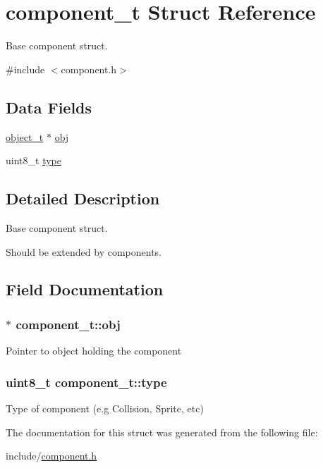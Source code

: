 \hypertarget{structcomponent__t}{}\section{component\+\_\+t Struct Reference}
\label{structcomponent__t}


Base component struct.  




{\ttfamily \#include $<$component.\+h$>$}

\subsection*{Data Fields}
\begin{DoxyCompactItemize}
\item 
\hyperlink{structobject__t}{object\+\_\+t} $\ast$ \hyperlink{structcomponent__t_a91ca5a259f6a90c3ed6e3cf433c30537}{obj}
\item 
uint8\+\_\+t \hyperlink{structcomponent__t_a540e44777d93cf3b028acee101676dc5}{type}
\end{DoxyCompactItemize}


\subsection{Detailed Description}
Base component struct. 

Should be extended by components. 

\subsection{Field Documentation}
\subsubsection[{\texorpdfstring{obj}{obj}}]{$\ast$ component\+\_\+t\+::obj}\hypertarget{structcomponent__t_a91ca5a259f6a90c3ed6e3cf433c30537}{}\label{structcomponent__t_a91ca5a259f6a90c3ed6e3cf433c30537}
Pointer to object holding the component 
\subsubsection[{\texorpdfstring{type}{type}}]{\setlength{\rightskip}{0pt plus 5cm}uint8\+\_\+t component\+\_\+t\+::type}\hypertarget{structcomponent__t_a540e44777d93cf3b028acee101676dc5}{}\label{structcomponent__t_a540e44777d93cf3b028acee101676dc5}
Type of component (e.\+g Collision, Sprite, etc) 

The documentation for this struct was generated from the following file\+:\begin{DoxyCompactItemize}
\item 
include/\hyperlink{component_8h}{component.\+h}\end{DoxyCompactItemize}
